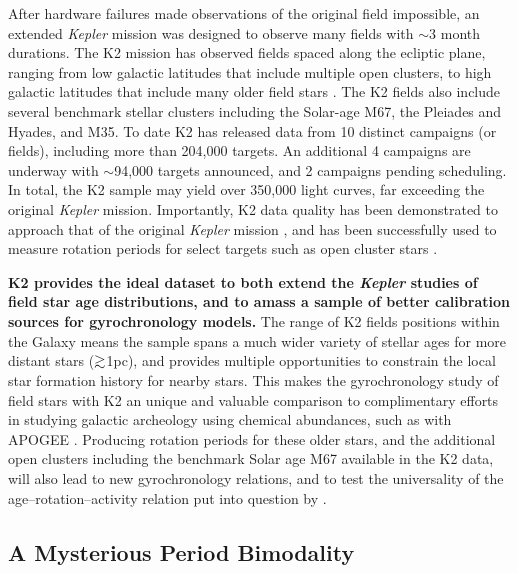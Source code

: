 \documentclass[12pt]{article}
\newcommand{\Kepler}{\textsl{Kepler}\xspace}
\def\gtrsim{\mathrel{\hbox{\rlap{\hbox{\lower3pt\hbox{$\sim$}}}\hbox{\raise2pt\hbox{$>$}}}}}
\begin{document}
After hardware failures made observations of the original field impossible, an extended \Kepler mission was designed to observe many fields with $\sim$3 month durations. The K2 mission has observed fields spaced along the ecliptic plane, ranging from low galactic latitudes that include multiple open clusters, to high galactic latitudes that include many older field stars \citep{howell2014}. The K2 fields also include several benchmark stellar clusters including the Solar-age M67, the Pleiades and Hyades, and M35. To date K2 has released data from 10 distinct campaigns (or fields), including more than 204,000 targets. An additional 4 campaigns are underway with $\sim$94,000 targets announced, and 2 campaigns pending scheduling. In total, the K2 sample may yield over 350,000 light curves, far exceeding the original \Kepler mission. Importantly, K2 data quality has been demonstrated to approach that of the original \Kepler mission \citep{luger2016}, and has been successfully used to measure rotation periods for select targets such as open cluster stars \citep[e.g.][]{douglas2017}.



{\bf K2 provides the ideal dataset to both extend the \Kepler studies of field star age distributions, and to amass a sample of better calibration sources for gyrochronology models.} The range of K2 fields positions within the Galaxy means the sample spans a much wider variety of stellar ages for more distant stars ($\gtrsim$1pc), and provides multiple opportunities to constrain the local star formation history for nearby stars. This makes the gyrochronology study of field stars with K2 an unique and valuable comparison to complimentary efforts in studying galactic archeology using chemical abundances, such as with APOGEE \citep{hayden2014}.
Producing rotation periods for these older stars, and the additional open clusters including the benchmark Solar age M67 available in the K2 data, will also lead to new gyrochronology relations, and to test the universality of the age--rotation--activity relation put into question by \citet{angus2015}.



\subsection{A Mysterious Period Bimodality}
\end{document}
